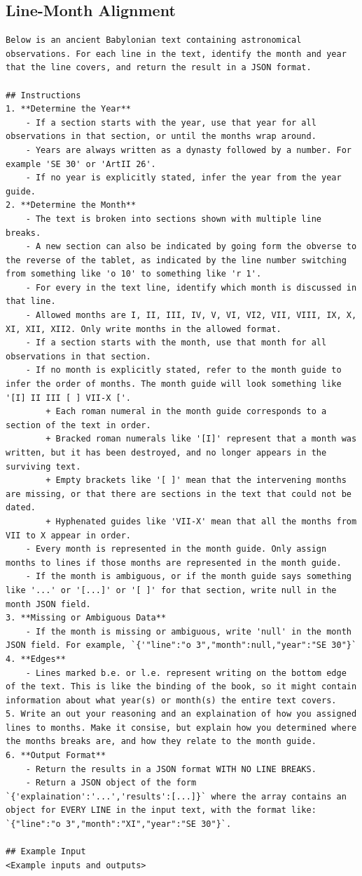 \documentclass{article}
\begin{document}
\subsection{Line-Month Alignment}
\begin{lstlisting}
Below is an ancient Babylonian text containing astronomical observations. For each line in the text, identify the month and year that the line covers, and return the result in a JSON format.

## Instructions
1. **Determine the Year**
	- If a section starts with the year, use that year for all observations in that section, or until the months wrap around.
	- Years are always written as a dynasty followed by a number. For example 'SE 30' or 'ArtII 26'.
	- If no year is explicitly stated, infer the year from the year guide.
2. **Determine the Month**
	- The text is broken into sections shown with multiple line breaks.
	- A new section can also be indicated by going form the obverse to the reverse of the tablet, as indicated by the line number switching from something like 'o 10' to something like 'r 1'.
	- For every in the text line, identify which month is discussed in that line.
	- Allowed months are I, II, III, IV, V, VI, VI2, VII, VIII, IX, X, XI, XII, XII2. Only write months in the allowed format.
	- If a section starts with the month, use that month for all observations in that section.
	- If no month is explicitly stated, refer to the month guide to infer the order of months. The month guide will look something like '[I] II III [ ] VII-X ['.
		+ Each roman numeral in the month guide corresponds to a section of the text in order.
		+ Bracked roman numerals like '[I]' represent that a month was written, but it has been destroyed, and no longer appears in the surviving text.
		+ Empty brackets like '[ ]' mean that the intervening months are missing, or that there are sections in the text that could not be dated.
		+ Hyphenated guides like 'VII-X' mean that all the months from VII to X appear in order.
	- Every month is represented in the month guide. Only assign months to lines if those months are represented in the month guide.
	- If the month is ambiguous, or if the month guide says something like '...' or '[...]' or '[ ]' for that section, write null in the month JSON field.
3. **Missing or Ambiguous Data**
	- If the month is missing or ambiguous, write 'null' in the month JSON field. For example, `{'"line":"o 3","month":null,"year":"SE 30"}`
4. **Edges**
	- Lines marked b.e. or l.e. represent writing on the bottom edge of the text. This is like the binding of the book, so it might contain information about what year(s) or month(s) the entire text covers.
5. Write an out your reasoning and an explaination of how you assigned lines to months. Make it consise, but explain how you determined where the months breaks are, and how they relate to the month guide.
6. **Output Format**
	- Return the results in a JSON format WITH NO LINE BREAKS.
	- Return a JSON object of the form `{'explaination':'...','results':[...]}` where the array contains an object for EVERY LINE in the input text, with the format like: `{"line":"o 3","month":"XI","year":"SE 30"}`.

## Example Input
<Example inputs and outputs>
\end{lstlisting}
\end{document}
